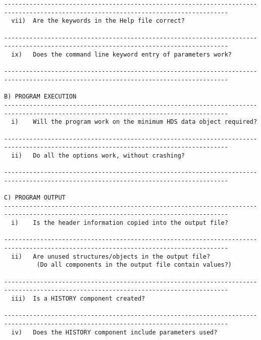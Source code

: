\begin{tiny}
\begin{verbatim}
------------------------------------------------------------------------------------------------------------------------------------
  vii)  Are the keywords in the Help file correct?      
                                             
------------------------------------------------------------------------------------------------------------------------------------
  ix)   Does the command line keyword entry of parameters work? 
                                                   
------------------------------------------------------------------------------------------------------------------------------------

B) PROGRAM EXECUTION 
------------------------------------------------------------------------------------------------------------------------------------
  i)    Will the program work on the minimum HDS data object required?                                    
                                                   
------------------------------------------------------------------------------------------------------------------------------------
  ii)   Do all the options work, without crashing?             
                                                   
------------------------------------------------------------------------------------------------------------------------------------

C) PROGRAM OUTPUT 
------------------------------------------------------------------------------------------------------------------------------------
  i)    Is the header information copied into the output file?      
                                                   
------------------------------------------------------------------------------------------------------------------------------------
  ii)   Are unused structures/objects in the output file?       
         (Do all components in the output file contain values?)      

------------------------------------------------------------------------------------------------------------------------------------
  iii)  Is a HISTORY component created?                        
                                                   
------------------------------------------------------------------------------------------------------------------------------------
  iv)   Does the HISTORY component include parameters used?      
                                                

\end{verbatim}
\end{tiny}
